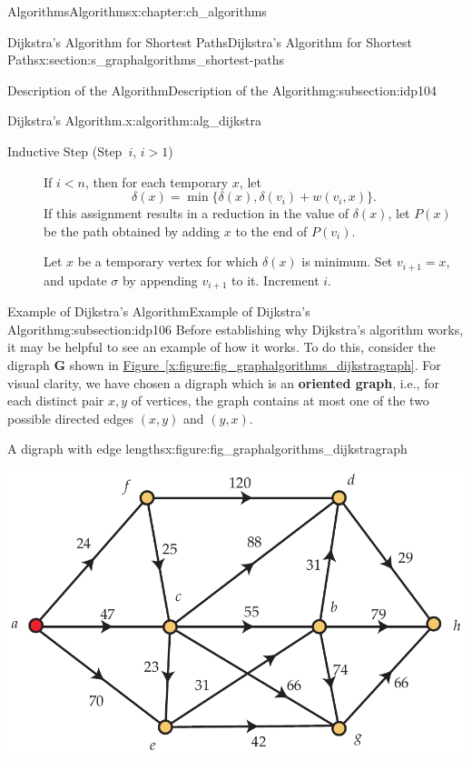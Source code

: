 \documentclass[oneside,10pt,]{book}
\newcommand{\xreffont}{\relax}
\newcommand{\terminology}[1]{\textbf{#1}}
\numberwithin{equation}{section}
\newcommand{\bfG}{\mathbf{G}}
\newcommand{\lt}{<}
\begin{document}
\begin{chapterptx}{Algorithms}{}{Algorithms}{}{}{x:chapter:ch_algorithms}
\begin{sectionptx}{Dijkstra's Algorithm for Shortest Paths}{}{Dijkstra's Algorithm for Shortest Paths}{}{}{x:section:s_graphalgorithms_shortest-paths}
\begin{subsectionptx}{Description of the Algorithm}{}{Description of the Algorithm}{}{}{g:subsection:idp104}
\begin{algorithm}{Dijkstra's Algorithm.}{}{x:algorithm:alg_dijkstra}
\begin{description}
\item[{Inductive Step (Step~\(i\), \(i>1\))}]If \(i\lt n\), then for each temporary \(x\), let%
\begin{equation*}
\delta(x) = \min\{\delta(x), \delta(v_i)+w(v_i,x)\}.
\end{equation*}
If this assignment results in a reduction in the value of \(\delta(x)\), let \(P(x)\) be the path obtained by adding \(x\) to the end of \(P(v_i)\).%
\par
Let \(x\) be a temporary vertex for which \(\delta(x)\) is minimum. Set \(v_{i+1}=x\), and update \(\sigma\) by appending \(v_{i+1}\) to it. Increment \(i\).%
\end{description}
%
\end{algorithm}
\end{subsectionptx}
%
%
\typeout{************************************************}
\typeout{************************************************}
%
\begin{subsectionptx}{Example of Dijkstra's Algorithm}{}{Example of Dijkstra's Algorithm}{}{}{g:subsection:idp106}
Before establishing why Dijkstra's algorithm works, it may be helpful to see an example of how it works. To do this, consider the digraph \(\bfG\) shown in \hyperref[x:figure:fig_graphalgorithms_dijkstragraph]{Figure~{\xreffont\ref{x:figure:fig_graphalgorithms_dijkstragraph}}}. For visual clarity, we have chosen a digraph which is an \terminology{oriented graph}, i.e.\@, for each distinct pair \(x,y\) of vertices, the graph contains at most one of the two possible directed edges \((x,y)\) and \((y,x)\).%
\begin{figureptx}{A digraph with edge lengths}{x:figure:fig_graphalgorithms_dijkstragraph}{}%
\begin{image}{0.075}{0.85}{0.075}%
\includegraphics[width=\linewidth]{images/dijkstragraph}

\end{image}
\end{figureptx}
\end{subsectionptx}
\end{sectionptx}
\end{chapterptx}
\end{document}

